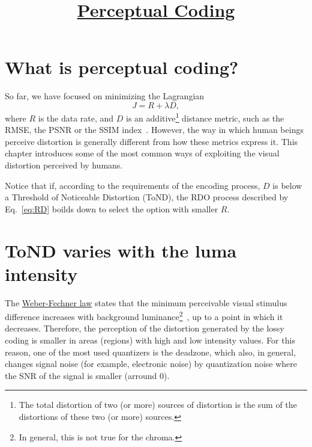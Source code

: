 

\title{\href{https://sistemas-multimedia.github.io/contents/perceptual_coding/}{Perceptual Coding}}

\maketitle
\tableofcontents

\section{What is perceptual coding?}

So far, we have focused on minimizing the
Lagrangian~\cite{sullivan1998rate}
\begin{equation}
  J = R + \lambda D,
  \label{eq:RD}
\end{equation}
where $R$ is the data rate, and $D$ is an additive\footnote{The total
distortion of two (or more) sources of distortion is the sum of the
distortions of these two (or more) sources.} distance metric, such as
the RMSE, the PSNR or the SSIM index~\cite{wang2004image}. However, the
way in which human beings perceive distortion is generally different
from how these metrics express it. This chapter introduces some of the
most common ways of exploiting the visual distortion perceived by
humans.

Notice that if, according to the requirements of the encoding process, $D$ is below
a Threshold of Noticeable Distortion (ToND), the RDO process described
by Eq.~\eqref{eq:RD} boilds down to select the option with smaller $R$.

\section{ToND varies with the luma intensity}

The
\href{https://en.wikipedia.org/wiki/Weber%E2%80%93Fechner_law}{Weber-Fechner law}
  states that the minimum perceivable visual stimulus difference
  increases with background luminance\footnote{In general, this is not
    true for the chroma.}~\cite{naccari2014perceptually}, up to a
  point in which it decreases. Therefore, the perception of the
  distortion generated by the lossy coding is smaller in areas
  (regions) with high and low intensity values. For this reason, one
  of the most used quantizers is the deadzone, which also, in general,
  changes signal noise (for example, electronic noise) by quantization
  noise where the SNR of the signal is smaller (arround 0).


